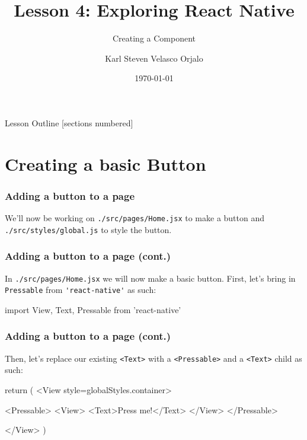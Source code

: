 \documentclass{beamer}
\title{Lesson 4: Exploring React Native}
\subtitle{Creating a Component}
\date{\today}
\author{Karl Steven Velasco Orjalo}
\institute{React Native Quickstart}
\begin{document}
  \maketitle

  \begin{frame}{Lesson Outline}
    [sections numbered]
    \tableofcontents
  \end{frame}

  \section{Creating a basic Button}
  \begin{frame}[fragile]
    \frametitle{Adding a button to a page}
    We'll now be working on \verb|./src/pages/Home.jsx| to make a button and \verb|./src/styles/global.js| to style the button. 
  \end{frame}
  \begin{frame}[fragile]
    \frametitle{Adding a button to a page (cont.)}
    In \verb|./src/pages/Home.jsx| we will now make a basic button. 
    First, let's bring in \verb|Pressable| from \verb|'react-native'| as such: 

    \begin{jscodesmall}
import {View, Text, Pressable} from 'react-native'
    \end{jscodesmall}
  \end{frame}
  \begin{frame}[fragile]
    \frametitle{Adding a button to a page (cont.)}
    Then, let's replace our existing \verb|<Text>| with a \verb|<Pressable>| and a \verb|<Text>| child as such: 

    \begin{jscodesmall}
return (
  <View style={globalStyles.container}>

    <Pressable>
        <View>
          <Text>Press me!</Text>
        </View>
    </Pressable>

  </View>
)
    \end{jscodesmall}
  \end{frame}
\end{document}
